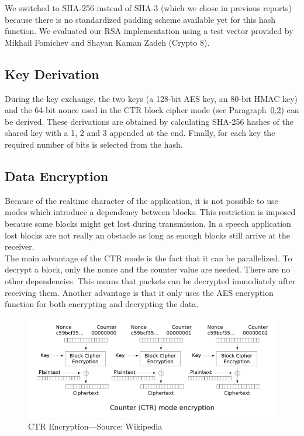 \documentclass[a4paper]{article}
\begin{document}
We switched to SHA-256 instead of SHA-3 (which we chose in previous reports) because there is no standardized padding scheme available yet for this hash function. We evaluated our RSA implementation using a test vector provided by Mikhail Fomichev and Shayan Kaman Zadeh (Crypto 8).

\subsection{Key Derivation}
\label{par:key_derivation}

During the key exchange, the two keys (a 128-bit AES key, an 80-bit HMAC key) and the 64-bit nonce used in the CTR block cipher mode (see Paragraph~\ref{par:data_encryption}) can be derived. These derivations are obtained by calculating SHA-256 hashes of the shared key with a 1, 2 and 3 appended at the end. Finally, for each key the required number of bits is selected from the hash.

\subsection{Data Encryption}
\label{par:data_encryption}

Because of the realtime character of the application, it is not possible to use modes which introduce a dependency between blocks. This restriction is imposed because some blocks might get lost during transmission. In a speech application lost blocks are not really an obstacle as long as enough blocks still arrive at the receiver.\\

The main advantage of the CTR mode is the fact that it can be parallelized. To decrypt a block, only the nonce and the counter value are needed. There are no other dependencies. This means that packets can be decrypted immediately after receiving them. Another advantage is that it only uses the AES encryption function for both encrypting and decrypting the data.\\

\begin{figure}[h]
    \centering
    \includegraphics[scale=0.75]{ctr_encryption.png}
    \caption{CTR Encryption---Source: Wikipedia}
    \label{fig:ctr_encryption}
\end{figure}
\end{document}
